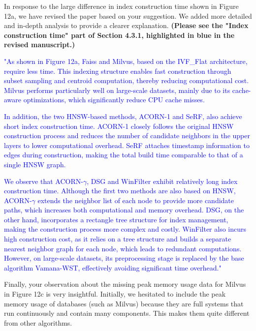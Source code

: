 \documentclass[sigconf, nonacm]{acmart}
\newcounter{detailed}[section]
\newcounter{observation}[section]
\begin{document}
In response to the large difference in index construction time shown in Figure 12a, we have revised the paper based on your suggestion. We added more detailed and in-depth analysis to provide a clearer explanation. \textbf{(Please see the "Index construction time" part of Section 4.3.1, highlighted in blue in the revised manuscript.)}

\textcolor{blue}{
"As shown in Figure 12a, Faiss and Milvus, based on the IVF\_Flat architecture, require less time. This indexing structure enables fast construction through subset sampling and centroid computation, thereby reducing computational cost. Milvus performs particularly well on large-scale datasets, mainly due to its cache-aware optimizations, which significantly reduce CPU cache misses.}

\textcolor{blue}{In addition, the two HNSW-based methods, ACORN-1 and SeRF, also achieve short index construction time. ACORN-1 closely follows the original HNSW construction process and reduces the number of candidate neighbors in the upper layers to lower computational overhead. SeRF attaches timestamp information to edges during construction, making the total build time comparable to that of a single HNSW graph.
}

\textcolor{blue}{We observe that ACORN-\(\gamma\), DSG and WinFilter exhibit relatively long index construction time. Although the first two methods are also based on HNSW, ACORN-\(\gamma\) extends the neighbor list of each node to provide more candidate paths, which increases both computational and memory overhead. DSG, on the other hand, incorporates a rectangle tree structure for index management, making the construction process more complex and costly. 
	WinFilter also incurs high construction cost, as it relies on a tree structure and builds a separate nearest neighbor graph for each node, which leads to redundant computations. However, on large-scale datasets, its preprocessing stage is replaced by the base algorithm Vamana-WST, effectively avoiding significant time overhead."}





Finally, your observation about the missing peak memory usage data for Milvus in Figure 12c is very insightful. Initially, we hesitated to include the peak memory usage of databases (such as Milvus) because they are full systems that run continuously and contain many components. This makes them quite different from other algorithms.
\end{document}
